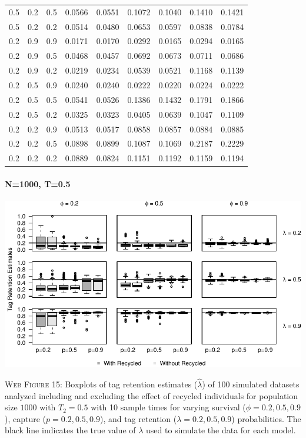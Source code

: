 \documentclass[]{article}
\let\oldparagraph\paragraph
\renewcommand{\paragraph}[1]{\oldparagraph{#1}\mbox{}}
\begin{document}
\begin{table}[ht]
{\begin{tabular}{rrrrrrrrr}
  0.5 & 0.2 & 0.5 & 0.0566 & 0.0551 & 0.1072 & 0.1040 & 0.1410 & 0.1421 \\ 
  0.5 & 0.2 & 0.2 & 0.0514 & 0.0480 & 0.0653 & 0.0597 & 0.0838 & 0.0784 \\ 
  0.2 & 0.9 & 0.9 & 0.0171 & 0.0170 & 0.0292 & 0.0165 & 0.0294 & 0.0165 \\ 
  0.2 & 0.9 & 0.5 & 0.0468 & 0.0457 & 0.0692 & 0.0673 & 0.0711 & 0.0686 \\ 
  0.2 & 0.9 & 0.2 & 0.0219 & 0.0234 & 0.0539 & 0.0521 & 0.1168 & 0.1139 \\ 
  0.2 & 0.5 & 0.9 & 0.0240 & 0.0240 & 0.0222 & 0.0220 & 0.0224 & 0.0222 \\ 
  0.2 & 0.5 & 0.5 & 0.0541 & 0.0526 & 0.1386 & 0.1432 & 0.1791 & 0.1866 \\ 
  0.2 & 0.5 & 0.2 & 0.0325 & 0.0323 & 0.0405 & 0.0639 & 0.1047 & 0.1109 \\ 
  0.2 & 0.2 & 0.9 & 0.0513 & 0.0517 & 0.0858 & 0.0857 & 0.0884 & 0.0885 \\ 
  0.2 & 0.2 & 0.5 & 0.0898 & 0.0899 & 0.1087 & 0.1069 & 0.2187 & 0.2229 \\ 
  0.2 & 0.2 & 0.2 & 0.0889 & 0.0824 & 0.1151 & 0.1192 & 0.1159 & 0.1194 \\ 
   \hline
\end{tabular}
}
\endgroup
\end{table}

\newpage

\paragraph{N=1000, T=0.5}\label{n1000-t0.5-2}

\includegraphics{Appendix_BW_files/figure-latex/figure15_tagretention_GJSTL4-1.pdf}

\textsc{Web Figure 15:} Boxplots of tag retention estimates
(\(\hat{\lambda}\)) of 100 simulated datasets analyzed including and excluding
the effect of recycled individuals for population size \(1000\) with
\(T_2=0.5\) with 10 sample times for varying survival
(\(\phi=0.2,0.5,0.9\)), capture (\(p=0.2,0.5,0.9\)), and tag retention
(\(\lambda=0.2,0.5,0.9\)) probabilities. The black line indicates the
true value of \(\lambda\) used to simulate the data for each model.
\end{document}
